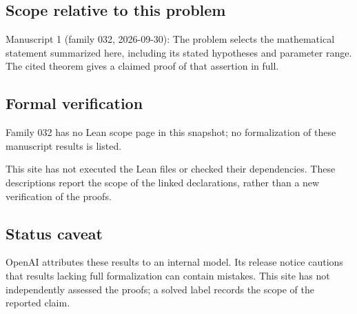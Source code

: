 \documentclass[11pt]{article}
\begin{document}
\subsection{Scope relative to this problem}
Manuscript 1 (family 032, 2026-09-30): The problem selects the mathematical statement summarized here, including its stated hypotheses and parameter range. The cited theorem gives a claimed proof of that assertion in full.

\subsection{Formal verification}
Family 032 has no Lean scope page in this snapshot; no formalization of these manuscript results is listed.

This site has not executed the Lean files or checked their dependencies. These descriptions report the scope of the linked declarations, rather than a new verification of the proofs.

\subsection{Status caveat}
OpenAI attributes these results to an internal model. Its release notice cautions that results lacking full formalization can contain mistakes. This site has not independently assessed the proofs; a solved label records the scope of the reported claim.
\end{document}
